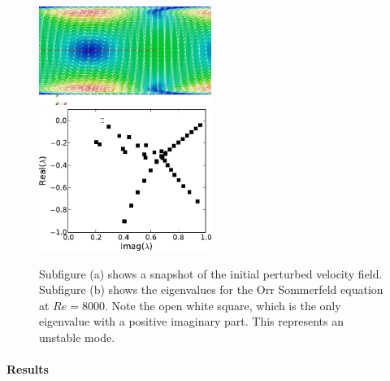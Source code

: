 \begin{figure}
\includegraphics[width=0.5\textwidth]{chapters/mortensen/pdf/OS_init.pdf}
\includegraphics[width=0.5\textwidth]{chapters/mortensen/pdf/OrrS_eigvals.pdf}
\caption{Subfigure (a) shows a snapshot of the initial perturbed velocity field. Subfigure (b) shows the eigenvalues for the Orr Sommerfeld equation at $Re=8000$. Note the open white square, which is the only eigenvalue with a positive imaginary part. This represents an unstable mode.}
 \label{fig:mortensen:OS_init}
\end{figure}

\paragraph{Results}

